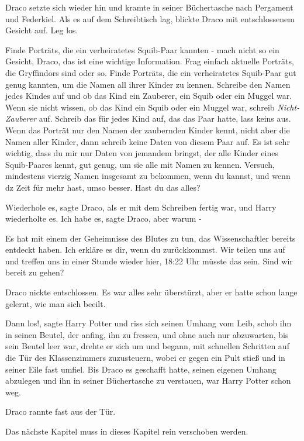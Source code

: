 Draco setzte sich wieder hin und kramte in seiner Büchertasche nach Pergament
und Federkiel. Als es auf dem Schreibtisch lag, blickte Draco mit entschlossenem
Gesicht auf. \glqq Leg los.\grqq{}

\glqq Finde Porträts, die ein verheiratetes Squib-Paar kannten - mach nicht so
ein Gesicht, Draco, das ist eine wichtige Information. Frag einfach aktuelle
Porträts, die Gryffindors sind oder so. Finde Porträts, die ein verheiratetes
Squib-Paar gut genug kannten, um die Namen all ihrer Kinder zu kennen. Schreibe
den Namen jedes Kindes auf und ob das Kind ein Zauberer, ein Squib oder ein
Muggel war. Wenn sie nicht wissen, ob das Kind ein Squib oder ein Muggel war,
schreib \emph{\glqq Nicht-Zauberer\grqq{} } auf. Schreib das für jedes Kind auf,
das das Paar hatte, lass keins aus. Wenn das Porträt nur den Namen der
zaubernden Kinder kennt, nicht aber die Namen aller Kinder, dann schreib keine
Daten von diesem Paar auf. Es ist sehr wichtig, dass du mir nur Daten von
jemandem bringst, der alle Kinder eines Squib-Paares kennt, gut genug, um sie
alle mit Namen zu kennen. Versuch, mindestens vierzig Namen insgesamt zu
bekommen, wenn du kannst, und wenn dz Zeit für mehr hast, umso besser. Hast du
das alles?\grqq{}

\glqq Wiederhole es\grqq{}, sagte Draco, als er mit dem Schreiben fertig war,
und Harry wiederholte es. \glqq Ich habe es\grqq{}, sagte Draco, \glqq aber
warum -\grqq{}

\glqq Es hat mit einem der Geheimnisse des Blutes zu tun, das Wissenschaftler
bereits entdeckt haben. Ich erkläre es dir, wenn du zurückkommst. Wir teilen uns
auf und treffen uns in einer Stunde wieder hier, 18:22 Uhr müsste das sein. Sind
wir bereit zu gehen?\grqq{}

Draco nickte entschlossen. Es war alles sehr überstürzt, aber er hatte schon
lange gelernt, wie man sich beeilt.

\glqq Dann los!\grqq{}, sagte Harry Potter und riss sich seinen Umhang vom Leib,
schob ihn in seinen Beutel, der anfing, ihn zu fressen, und ohne auch nur
abzuwarten, bis sein Beutel leer war, drehte er sich um und begann, mit
schnellen Schritten auf die Tür des Klassenzimmers zuzusteuern, wobei er gegen
ein Pult stieß und in seiner Eile fast umfiel. Bis Draco es geschafft hatte,
seinen eigenen Umhang abzulegen und ihn in seiner Büchertasche zu verstauen, war
Harry Potter schon weg.

Draco rannte fast aus der Tür.


Das nächste Kapitel muss in dieses Kapitel rein verschoben werden.

